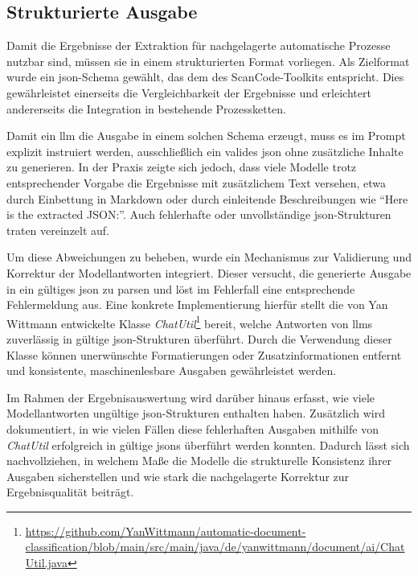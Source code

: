 
\subsection{Strukturierte Ausgabe}\label{subsec:strukturierte-ausgabe}

Damit die Ergebnisse der Extraktion für nachgelagerte automatische Prozesse nutzbar sind, müssen sie in einem strukturierten Format vorliegen.
Als Zielformat wurde ein \gls{json}-Schema gewählt, das dem des ScanCode-Toolkits entspricht.
Dies gewährleistet einerseits die Vergleichbarkeit der Ergebnisse und erleichtert andererseits die Integration in bestehende Prozessketten.

Damit ein \gls{llm} die Ausgabe in einem solchen Schema erzeugt, muss es im Prompt explizit instruiert werden, ausschließlich ein valides \gls{json} ohne zusätzliche Inhalte zu generieren.
In der Praxis zeigte sich jedoch, dass viele Modelle trotz entsprechender Vorgabe die Ergebnisse mit zusätzlichem Text versehen, etwa durch Einbettung in Markdown oder durch einleitende Beschreibungen wie \enquote{Here is the extracted JSON:}.
Auch fehlerhafte oder unvollständige \gls{json}-Strukturen traten vereinzelt auf.

Um diese Abweichungen zu beheben, wurde ein Mechanismus zur Validierung und Korrektur der Modellantworten integriert.
Dieser versucht, die generierte Ausgabe in ein gültiges \gls{json} zu parsen und löst im Fehlerfall eine entsprechende Fehlermeldung aus.
Eine konkrete Implementierung hierfür stellt die von Yan Wittmann entwickelte Klasse \textit{ChatUtil}\footnote{\url{https://github.com/YanWittmann/automatic-document-classification/blob/main/src/main/java/de/yanwittmann/document/ai/ChatUtil.java}} bereit, welche Antworten von \glspl{llm} zuverlässig in gültige \gls{json}-Strukturen überführt.
Durch die Verwendung dieser Klasse können unerwünschte Formatierungen oder Zusatzinformationen entfernt und konsistente, maschinenlesbare Ausgaben gewährleistet werden.

Im Rahmen der Ergebnisauswertung wird darüber hinaus erfasst, wie viele Modellantworten ungültige \gls{json}-Strukturen enthalten haben.
Zusätzlich wird dokumentiert, in wie vielen Fällen diese fehlerhaften Ausgaben mithilfe von \textit{ChatUtil} erfolgreich in gültige \gls{json}s überführt werden konnten.
Dadurch lässt sich nachvollziehen, in welchem Maße die Modelle die strukturelle Konsistenz ihrer Ausgaben sicherstellen und wie stark die nachgelagerte Korrektur zur Ergebnisqualität beiträgt.

